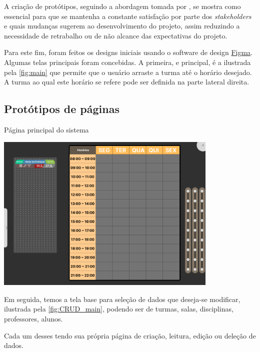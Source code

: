 A criação de protótipos, seguindo a abordagem tomada por \cite{andre_interaction_2018}, se mostra como essencial para que se mantenha a constante satisfação por parte dos \textit{stakeholders} e quais mudanças sugerem ao desenvolvimento do projeto, assim reduzindo a necessidade de retrabalho ou de não alcance das expectativas do projeto.

Para este fim, foram feitos os designs iniciais usando o software de design \href{https://www.figma.com/}{Figma}. Algumas telas principais foram concebidas. A primeira, e principal, é a ilustrada pela \autoref{fig:main} que permite que o usuário arraste a turma até o horário desejado. A turma ao qual este horário se refere pode ser definida na parte lateral direita.
\subsection{Protótipos de páginas} %


\begin{MyCenteredFigure}
  \caption{Página principal do sistema}
  \label{fig:main}
  \includegraphics[width=0.8\textwidth]{files/img/Prototipo/Medio/main}
\end{MyCenteredFigure} %

Em seguida, temos a tela base para seleção de dados que deseja-se modificar, ilustrada pela \autoref{fig:CRUD_main}, podendo ser de turmas, salas, disciplinas, professores, alunos.

Cada um desses tendo sua própria página de criação, leitura, edição ou deleção de dados.

